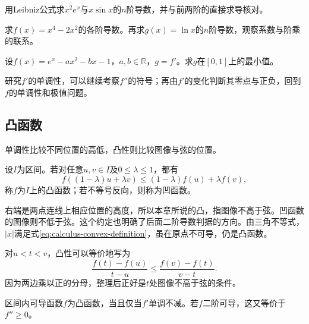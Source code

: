 \begin{example}
用Leibniz公式求\(x^2e^x\)与\(x\sin x\)的\(n\)阶导数，并与前两阶的直接求导核对。
\end{example}

\begin{example}
求\(f(x)=x^4-2x^2\)的各阶导数。再求\(g(x)=\ln x\)的\(n\)阶导数，观察系数与阶乘的联系。
\end{example}

\begin{example}[2014年四川卷理科第21题第（1）问]
\label{ex:calculus-sichuan-derivatives}
设\(f(x)=e^x-ax^2-bx-1\)，\(a,b\in\mathbb R\)，\(g=f'\)。求\(g\)在\([0,1]\)上的最小值。
\end{example}

研究\(f'\)的单调性，可以继续考察\(f''\)的符号；再由\(f'\)的变化判断其零点与正负，回到\(f\)的单调性和极值问题。

\subsection{凸函数}
\label{subsec:calculus-convexity}

单调性比较不同位置的高低，凸性则比较图像与弦的位置。

\begin{definition}
设\(I\)为区间。若对任意\(u,v\in I\)及\(0\le\lambda\le1\)，都有
\begin{equation}\label{eq:calculus-convex-definition}
 f((1-\lambda)u+\lambda v)
 \le(1-\lambda)f(u)+\lambda f(v),
\end{equation}
称\(f\)为\(I\)上的{\heiti{}凸函数}；若不等号反向，则称为{\heiti{}凹函数}。
\end{definition}

右端是两点连线上相应位置的高度，所以本章所说的凸，指图像不高于弦。凹函数的图像则不低于弦。这个约定也明确了后面二阶导数判据的方向。由三角不等式，\(|x|\)满足式\eqref{eq:calculus-convex-definition}，虽在原点不可导，仍是凸函数。

对\(u<t<v\)，凸性可以等价地写为
\begin{equation}\label{eq:calculus-convex-slopes}
 \frac{f(t)-f(u)}{t-u}\le\frac{f(v)-f(t)}{v-t}.
\end{equation}
因为两边乘以正的分母，整理后正好是\(t\)处图像不高于弦的条件。

\begin{theorem}\label{thm:calculus-convex-derivative}
区间内可导函数\(f\)为凸函数，当且仅当\(f'\)单调不减。若\(f\)二阶可导，这又等价于\(f''\ge0\)。
\end{theorem}

